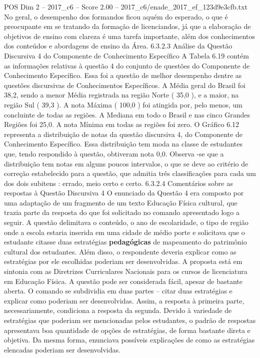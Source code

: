 \begin{textsample}{POS Dim 2 – 2017\_c6 – Score 2.00 – 2017\_c6/enade\_2017\_ef\_123d9e3cfb.txt}
No geral, o desempenho dos formandos ficou aquém do esperado, o que é preocupante em se tratando da formação de licenciandos, já que a elaboração de objetivos de ensino com clareza é uma tarefa importante, além dos conhecimentos dos conteúdos e abordagens de ensino da Área. 6.3.2.3 Análise da Questão Discursiva 4 do Componente de Conhecimento Específico A Tabela 6.19 contém as informações relativas à questão 4 do conjunto de questões do Componente de Conhecimento Específico.
Essa foi a questão de melhor desempenho dentre as questões discursivas de Conhecimentos Específicos.
A Média geral do Brasil foi 38,2, sendo a menor Média registrada na região Norte ( 35,0 ), e a maior, na região Sul ( 39,3 ).
A nota Máxima ( 100,0 ) foi atingida por, pelo menos, um concluinte de todas as regiões.
A Mediana em todo o Brasil e nas cinco Grandes Regiões foi 25,0.
A nota Mínima em todas as regiões foi zero.
O Gráfico 6.12 representa a distribuição de notas da questão discursiva 4, do Componente de Conhecimento Específico.
Essa distribuição tem moda na classe de estudantes que, tendo respondido à questão, obtiveram nota 0,0.
Observa -se que a distribuição tem notas em alguns poucos intervalos, o que se deve ao critério de correção estabelecido para a questão, que admitia três classificações para cada um dos dois subitens : errado, meio certo e certo. 6.3.2.4 Comentários sobre as respostas à Questão Discursiva 4 O enunciado da Questão 4 era composto por uma adaptação de um fragmento de um texto Educação Física cultural, que trazia parte da resposta do que foi solicitado no comando apresentado logo a seguir.
A questão delimitava o conteúdo, o ano de escolaridade, o tipo de região onde a escola estaria inserida em uma cidade de médio porte e solicitava que o estudante citasse duas estratégias \textbf{pedagógicas} de mapeamento do patrimônio cultural dos estudantes.
Além disso, o respondente deveria explicar como as estratégias por ele escolhidas poderiam ser desenvolvidas.
A proposta está em sintonia com as Diretrizes Curriculares Nacionais para os cursos de licenciatura em Educação Física.
A questão pode ser considerada fácil, apesar de bastante aberta.
O comando se subdividia em duas partes – citar duas estratégias e explicar como poderiam ser desenvolvidas.
Assim, a resposta à primeira parte, necessariamente, condiciona a resposta da segunda.
Devido à variedade de estratégias que poderiam ser mencionadas pelos estudantes, o padrão de respostas apresentava boa quantidade de opções de estratégias, de forma bastante direta e objetiva.
Da mesma forma, enunciava possíveis explicações de como as estratégias elencadas poderiam ser desenvolvidas.

\end{textsample}

